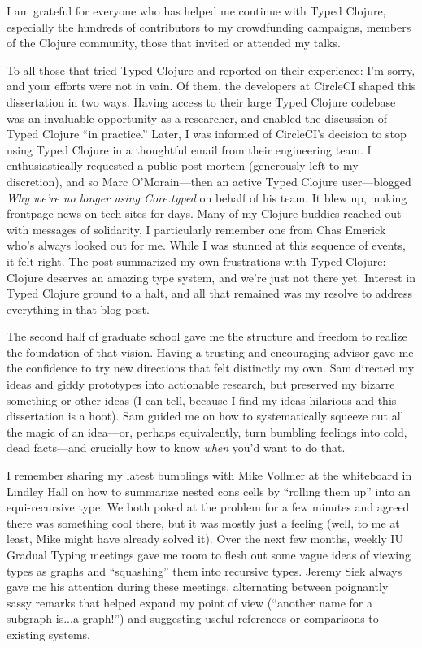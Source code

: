 

I am grateful for everyone who has helped me continue
with Typed Clojure, especially the hundreds of
contributors to my crowdfunding campaigns, members of the
Clojure community, those that invited or attended my talks.

To all those that tried Typed Clojure and reported on their experience: I'm sorry, 
and your efforts were not in vain.
Of them, the developers at CircleCI shaped this dissertation in two ways.
Having access to their large Typed Clojure
codebase was an invaluable opportunity as a researcher, and enabled the
discussion of Typed Clojure ``in practice.''
Later, I was informed of CircleCI's decision to stop using Typed Clojure
in a thoughtful email from their engineering team.
I enthusiastically requested a public post-mortem (generously left
to my discretion), and so
Marc O'Morain---then an active Typed Clojure user---blogged \emph{Why we're no longer using Core.typed}
on behalf of his team.
It blew up, making frontpage news on tech sites for days.
Many of my Clojure buddies reached out with messages of solidarity, I particularly remember 
one from Chas Emerick who's always looked out for me.
While I was stunned at this sequence of events, it felt right.
The post summarized my own frustrations with Typed Clojure: Clojure
deserves an amazing type system, and we're just not there yet.
Interest in Typed Clojure ground to a halt,
and all that remained was my resolve to address everything in that blog
post.

The second half of graduate school gave me the structure and freedom to
realize the foundation of that vision. Having a trusting and encouraging advisor
gave me the confidence to try new directions that felt distinctly my own.
Sam directed my ideas and giddy prototypes into actionable research,
but preserved my bizarre something-or-other ideas (I can tell, because
I find my ideas hilarious and this dissertation is a hoot).
Sam guided me on how to systematically squeeze out all the magic of an idea---or, perhaps
equivalently, turn bumbling feelings into cold, dead facts---and crucially how to know \emph{when} you'd
want to do that.

I remember sharing my latest bumblings with Mike Vollmer at the whiteboard in Lindley Hall
on how to summarize nested cons cells by ``rolling them up'' into an equi-recursive type.
We both poked at the problem for a few minutes and agreed there was something cool there,
but it was mostly just a feeling (well, to me at least, Mike might have already solved it).
Over the next few months, weekly IU Gradual Typing meetings
gave me room to flesh out some vague ideas of viewing types as graphs and ``squashing''
them into recursive types.
Jeremy Siek always gave me his attention during these meetings,
alternating between poignantly sassy remarks that helped expand my point of view
(``another name for a subgraph is...a graph!'')
and suggesting useful references or comparisons to existing systems.

